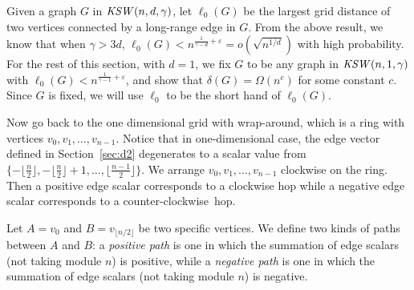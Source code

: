 \documentclass[11pt]{article}
\def\KSW{{\it KSW }}
\begin{document}
Given a graph $G$ in $\KSW(n,d,\gamma)$, 
	let $\ell_0(G)$ be the largest grid distance of two vertices connected by 
	a long-range edge in $G$.
From the above result, we know that when $\gamma>3d$, 
	$\ell_0(G)<n^{\frac{1}{\gamma-d}+\varepsilon}=o(\sqrt{n^{1/d}})$ with high probability.
For the rest of this section, with $d=1$, 
	we fix $G$ to be any graph in $\KSW(n,1,\gamma)$
	with $\ell_0(G)<n^{\frac{1}{\gamma-1}+\varepsilon}$, and 
	show that $\delta(G) = \Omega(n^c)$
	for some constant $c$.
Since $G$ is fixed, we will use $\ell_0$ to be the short hand of $\ell_0(G)$.


Now go back to the one dimensional grid with wrap-around, which is
	a ring with vertices $v_0,v_1,\ldots, v_{n-1}$.
Notice that in one-dimensional case, the edge vector defined in 
	Section~\ref{sec:d2} degenerates to a scalar value from
	$\{-\lfloor\frac{n}{2}\rfloor,-\lfloor\frac{n}{2}\rfloor+1,
	\ldots,\lfloor\frac{n-1}{2}\rfloor\}$.
We arrange $v_0,v_1,\ldots, v_{n-1}$ clockwise on the ring.
Then a positive edge scalar corresponds to a clockwise hop while a negative
	edge scalar corresponds to a counter-clockwise~hop.

Let $A=v_0$ and $B=v_{\lfloor n/2\rfloor}$ be two specific vertices. 
We define two kinds of paths between $A$ and $B$: a {\em positive path}
	is one in which the summation of edge scalars (not taking module $n$)
	is positive, while a {\em negative path} is one in which the summation
	of edge scalars (not taking module $n$) is negative.




\end{document}
